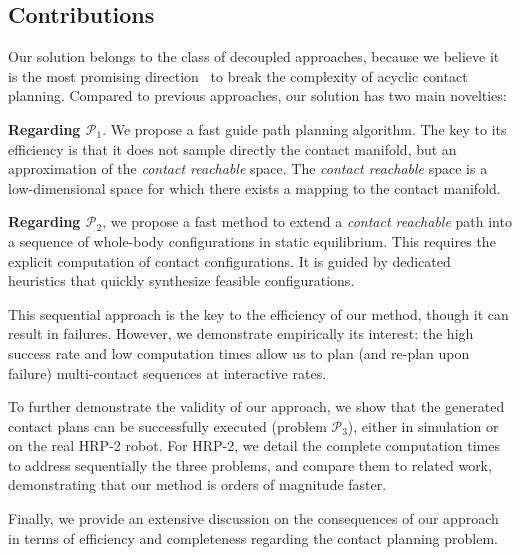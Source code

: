 \subsection{Contributions}

Our solution belongs to the class of decoupled approaches, because we believe it is the most promising direction~\citep{DBLP:conf/iser/EscandeKMG08} to break the complexity of acyclic contact planning. Compared to previous approaches, our solution has two main novelties: 

\noindent \textbf{Regarding $\mathcal{P}_1$}. We propose a fast guide path planning algorithm. The key to its efficiency is that it does not sample directly the contact manifold, but an approximation of the \textit{contact reachable} space. The \textit{contact reachable} space is a low-dimensional space for which there exists a mapping to the contact manifold.

\noindent \textbf{Regarding $\mathcal{P}_2$},  we propose a fast method to extend a \textit{contact reachable} path into a sequence of whole-body configurations in static equilibrium. This  requires the explicit computation of contact configurations. It is guided by dedicated heuristics that quickly synthesize feasible configurations.

This sequential approach is the key to the efficiency of our method, though it
can result in failures. However, we demonstrate empirically its interest: the high success rate and low computation times allow us to plan (and re-plan upon failure) multi-contact sequences at \gls{interactive} rates.

To further demonstrate the validity of our approach, we show that the generated contact plans  can be successfully executed (problem  $\mathcal{P}_3$), either in simulation or on the real HRP-2 robot. For HRP-2, we detail the complete computation times to address sequentially the three problems, and compare them to related work, demonstrating that our method is orders of magnitude faster.

Finally, we provide an extensive discussion on the consequences of our approach in terms of efficiency and completeness regarding the contact planning problem. 




